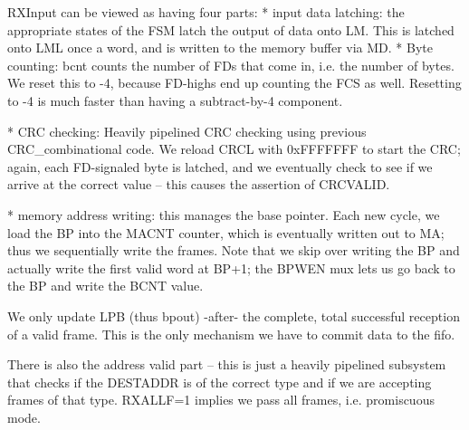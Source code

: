 RXInput can be viewed as having four parts:
   * input data latching: the appropriate states of the FSM latch the output of data onto LM. This is latched onto LML once a word, and is written to the memory buffer via MD. 
   * Byte counting: bcnt counts the number of FDs that come in, i.e. the number of bytes. We reset this to -4, because FD-highs end up counting the FCS as well. Resetting to -4 is much faster than having a subtract-by-4 component. 


   * CRC checking: Heavily pipelined CRC checking using previous
     CRC_combinational code. We reload CRCL with 0xFFFFFFF to start
     the CRC; again, each FD-signaled byte is latched, and we
     eventually check to see if we arrive at the correct value -- this
     causes the assertion of CRCVALID.

    * memory address writing: this manages the base pointer. Each new
      cycle, we load the BP into the MACNT counter, which is
      eventually written out to MA; thus we sequentially write the
      frames. Note that we skip over writing the BP and actually write
      the first valid word at BP+1; the BPWEN mux lets us go back to
      the BP and write the BCNT value.

    We only update LPB (thus bpout) -after- the complete, total successful reception of a valid frame. This is the only mechanism we have to commit data to the fifo. 

There is also the address valid part -- this is just a heavily
pipelined subsystem that checks if the DESTADDR is of the correct type
and if we are accepting frames of that type. RXALLF=1 implies we pass
all frames, i.e. promiscuous mode.

